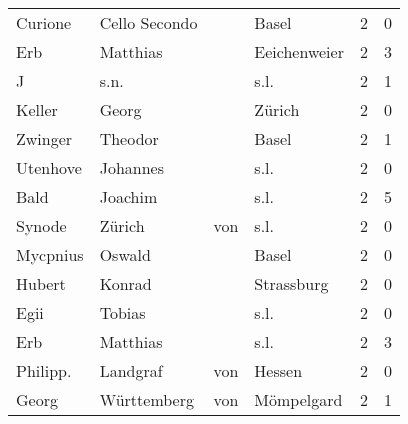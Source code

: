 \begin{tabular}{llllrr}
                  Curione &                      Cello Secondo &             &                                       Basel &          2 &         0 \\
                      Erb &                           Matthias &             &                                Eeichenweier &          2 &         3 \\
                        J &                               s.n. &             &                                        s.l. &          2 &         1 \\
                   Keller &                              Georg &             &                                      Zürich &          2 &         0 \\
                  Zwinger &                            Theodor &             &                                       Basel &          2 &         1 \\
                 Utenhove &                           Johannes &             &                                        s.l. &          2 &         0 \\
                     Bald &                            Joachim &             &                                        s.l. &          2 &         5 \\
                   Synode &                             Zürich &         von &                                        s.l. &          2 &         0 \\
                 Mycpnius &                             Oswald &             &                                       Basel &          2 &         0 \\
                   Hubert &                             Konrad &             &                                  Strassburg &          2 &         0 \\
                     Egii &                             Tobias &             &                                        s.l. &          2 &         0 \\
                      Erb &                           Matthias &             &                                        s.l. &          2 &         3 \\
                 Philipp. &                           Landgraf &         von &                                      Hessen &          2 &         0 \\
                    Georg &                        Württemberg &         von &                                  Mömpelgard &          2 &         1 \\

\end{tabular}
